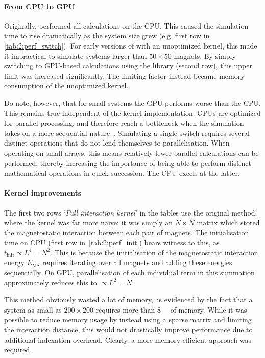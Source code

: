 \paragraph{From CPU to GPU}
Originally, \hotspice performed all calculations on the CPU. %
This caused the simulation time to rise dramatically as the system size grew (e.g. first row in \cref{tab:2:perf_switch}).
For early versions of \hotspice with an unoptimized kernel, this made it impractical to simulate systems larger than $50 \times 50$ magnets.
By simply switching to GPU-based calculations using the  library (second row), this upper limit was increased significantly.
The limiting factor instead became memory consumption of the unoptimized kernel. \par
Do note, however, that for small systems the GPU performs worse than the CPU.
This remains true independent of the kernel implementation.
GPUs are optimized for parallel processing, and therefore reach a bottleneck when the simulation takes on a more sequential nature~\cite{owens2008gpu}.
Simulating a single switch requires several distinct operations that do not lend themselves to parallelisation.
When operating on small arrays, this means relatively fewer parallel calculations can be performed, thereby increasing the importance of being able to perform distinct mathematical operations in quick succession.
The CPU excels at the latter. %

\paragraph{Kernel improvements}
The first two rows `\textit{Full interaction kernel}' in the tables use the original method, where the kernel was far more naïve: it was simply an $N \times N$ matrix which stored the magnetostatic interaction between each pair of magnets.
The initialisation time on CPU (first row in~\cref{tab:2:perf_init}) bears witness to this, as $t_\mathrm{init} \propto L^4 = N^2$.
This is because the initialisation of the magnetostatic interaction energy $E_\mathrm{MS}$ requires iterating over all magnets and adding these energies sequentially.
On GPU, parallelisation of each individual term in this summation approximately reduces this to $\propto L^2 = N$. \par
This method obviously wasted a lot of memory, as evidenced by the fact that a system as small as $200 \times 200$ requires more than \SI{8}{\giga\byte} of memory.
While it was possible to reduce memory usage by instead using a sparse matrix and limiting the interaction distance, this would not drastically improve performance due to additional indexation overhead.
Clearly, a more memory-efficient approach was required. \\\par

